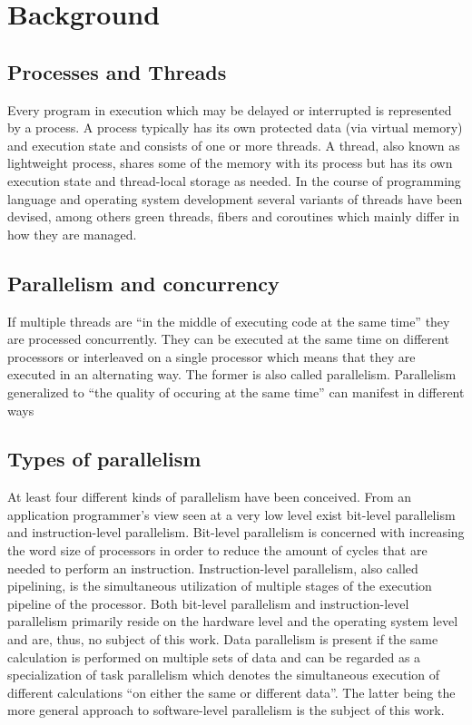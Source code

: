 \chapter{Background}

\section{Processes and Threads}
Every program in execution which may be delayed or interrupted is represented by a process. A process typically has its own protected data (via virtual memory) and execution state and consists of one or more threads. A thread, also known as lightweight process, shares some of the memory with its process but has its own execution state and thread-local storage as needed\cite[p.~20]{PrinciplesOfModernOSs}. In the course of programming language and operating system development several variants of threads have been devised, among others green threads, fibers and coroutines which mainly differ in how they are managed.

\section{Parallelism and concurrency}
If multiple threads are ``in the middle of executing code at the same time''\cite[p.~124(?)]{MultiProgWithJavaTech} they are processed concurrently. They can be executed at the same time on different processors or interleaved on a single processor which means that they are executed in an alternating way. The former is also called parallelism. Parallelism generalized to ``the quality of occuring at the same time''\cite[p.~91]{OSs_AConceptBasedApproach} can manifest in different ways %

\section{Types of parallelism}
At least four different kinds of parallelism have been conceived. From an application programmer's view seen at a very low level exist bit-level parallelism and instruction-level parallelism. Bit-level parallelism is concerned with increasing the word size of processors in order to reduce the amount of cycles that are needed to perform an instruction\cite[p.~15]{ParCompArchitecture_HW/SW_Approach}. Instruction-level parallelism, also called pipelining, is the simultaneous utilization of multiple stages of the execution pipeline of the processor. Both bit-level parallelism and instruction-level parallelism primarily reside on the hardware level and the operating system level and are, thus, no subject of this work. Data parallelism is present if the same calculation is performed on multiple sets of data and can be regarded as a specialization of task parallelism which denotes the simultaneous execution of different calculations ``on either the same or different data''\cite[p.~125]{ParCompArchitecture_HW/SW_Approach}. The latter being the more general approach to software-level parallelism is the subject of this work.

